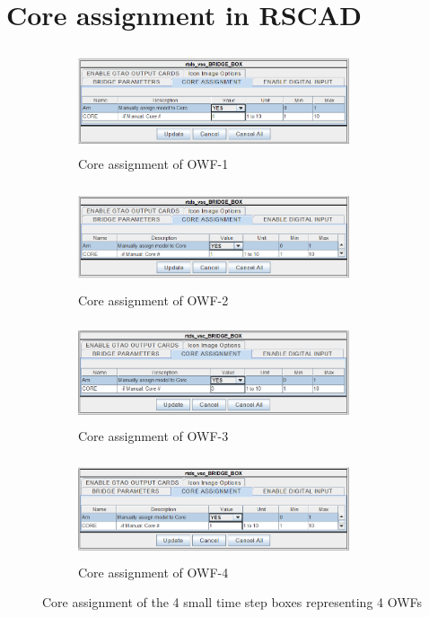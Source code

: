 \section{Core assignment in RSCAD}
\begin{figure}[H]
\begin{subfigure}{.5\textwidth}
  \centering
  \includegraphics[height = 3cm,width = 8cm]{Diagrams/Chapter_4/Core_assignment_OWF1.PNG}  
  \caption{Core assignment of OWF-1}
  \label{fig:Core_assignment_OWF1}
\end{subfigure}
\begin{subfigure}{.5\textwidth}
  \centering
  \includegraphics[height = 3cm,width = 8cm]{Diagrams/Chapter_4/Core_assignment_OWF2.PNG}  
  \caption{Core assignment of OWF-2}
  \label{fig:Core_assignment_OWF2}
\end{subfigure}

\newline

\begin{subfigure}{.5\textwidth}
  \centering
  \includegraphics[height = 3cm,width = 8cm]{Diagrams/Chapter_4/Core_assignment_OWF3.PNG}  
  \caption{Core assignment of OWF-3}
  \label{fig:Core_assignment_OWF3}
\end{subfigure}
\begin{subfigure}{.5\textwidth}
  \centering
  \includegraphics[height = 3cm,width = 8cm]{Diagrams/Chapter_4/Core_assignment_OWF4.PNG}  
  \caption{Core assignment of OWF-4}
  \label{fig:Core_assignment_OWF4}
\end{subfigure}
\caption{Core assignment of the 4 small time step boxes representing 4 OWFs}
\label{fig:Complete_Core_assignment_OWF}
\end{figure}

